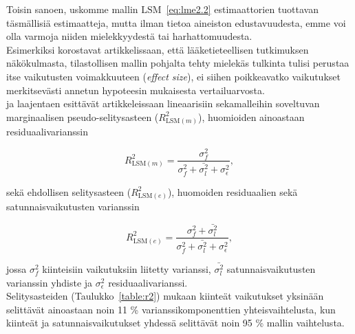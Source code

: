 \documentclass[finnish]{docopts}
\begin{document}
Toisin sanoen, uskomme mallin $\text{LSM}$~\ref{eq:lme2.2} estimaattorien tuottavan täsmällisiä estimaatteja, mutta ilman tietoa aineiston edustavuudesta, emme voi olla varmoja niiden mielekkyydestä tai harhattomuudesta.\\

Esimerkiksi \cite{sullivan12} korostavat artikkelissaan, että lääketieteellisen tutkimuksen näkökulmasta, tilastollisen mallin pohjalta tehty mielekäs tulkinta tulisi perustaa itse vaikutusten voimakkuuteen (\textit{effect size}), ei siihen poikkeavatko vaikutukset merkitsevästi annetun hypoteesin mukaisesta vertailuarvosta.\\



\cite{nakagawa13} ja laajentaen \cite{johnson14} esittävät artikkeleissaan lineaarisiin sekamalleihin soveltuvan marginaalisen pseudo-selitysasteen ($R^2_{\text{LSM}(m)}$), huomioiden ainoastaan residuaalivarianssin 

$$
R^2_{\text{LSM}(m)} = \frac{\sigma^2_{f}}{\sigma^2_{f} + \bar{\sigma^2_{l}} + \sigma^2_{\epsilon}},
$$

sekä ehdollisen selitysasteen ($R^2_{\text{LSM}(e)}$), huomoiden residuaalien sekä satunnaisvaikutusten varianssin

$$
R^2_{\text{LSM}(e)} = \frac{\sigma^2_{f} + \bar{\sigma^2_{l}}}{\sigma^2_{f} +  \bar{\sigma^2_{l}} + \sigma^2_{\epsilon}},
$$

jossa $\sigma^2_{f}$ kiinteisiin vaikutuksiin liitetty varianssi, $\bar{\sigma^2_{l}}$ satunnaisvaikutusten varianssin yhdiste ja  $\sigma^2_{\epsilon}$ residuaalivarianssi.\\

Selitysasteiden (Taulukko~\ref{table:r2}) mukaan kiinteät vaikutukset yksinään selittävät ainoastaan noin 11 \% varianssikomponenttien yhteisvaihtelusta, kun kiinteät ja satunnaisvaikutukset yhdessä selittävät noin 95 \% mallin vaihtelusta.\\
\end{document}
